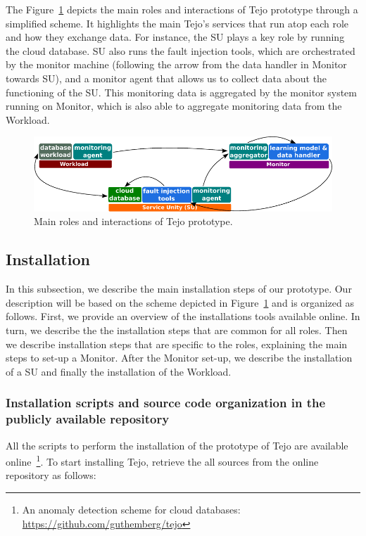 The Figure~\ref{fig:roles_scheme} depicts the main roles and interactions of Tejo prototype through a simplified scheme. It highlights the main Tejo's services that run atop each role and how they exchange data. For instance, the SU plays a key role by running the cloud database. SU also runs the fault injection tools, which are orchestrated by the monitor machine (following the arrow from the data handler in Monitor towards SU), and a monitor agent that allows us to collect data about the functioning of the SU. This monitoring data is aggregated by the monitor system running on Monitor, which is also able to aggregate monitoring data from the Workload.


\begin{figure}[!h]
  \centering
     \includegraphics[width=1\textwidth]{inputs/img/roles_scheme}
  \caption{Main roles and interactions of Tejo prototype.}
  \label{fig:roles_scheme}
\end{figure}


\subsection{Installation}

In this subsection, we describe the main installation steps of our prototype. Our description will be based on the scheme depicted in Figure~\ref{fig:roles_scheme} and is organized as follows. First, we provide an overview of the installations tools available online. In turn, we describe the the installation steps that are common for all roles. Then we describe installation steps that are specific to the roles, explaining the main steps to set-up a Monitor. After the Monitor set-up, we describe the installation of a SU and finally the installation of the Workload.

\subsubsection{Installation scripts and source code organization in the publicly available repository}
\label{subsubsec:gitclone}

All the scripts to perform the installation of the prototype of Tejo are available online~\footnote{An anomaly detection scheme for cloud databases: \url{https://github.com/guthemberg/tejo}}.  To start installing Tejo, retrieve the all sources from the online repository as follows:



